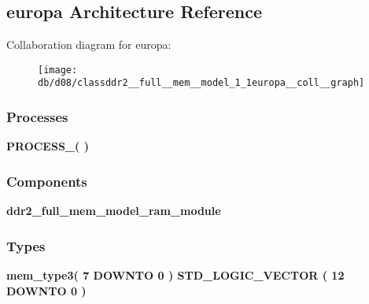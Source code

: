 \subsection{europa Architecture Reference}
\label{classddr2__full__mem__model_1_1europa}


Collaboration diagram for europa\+:\nopagebreak
\begin{figure}[H]
\begin{center}
\leavevmode
\texttt{[image: db/d08/classddr2\_\_full\_\_mem\_\_model\_1\_1europa\_\_coll\_\_graph]}
\end{center}
\end{figure}
\subsubsection*{Processes}
 \begin{DoxyCompactItemize}
\item 
{\bf P\+R\+O\+C\+E\+S\+S\+\_}{\bfseries  (  )}
\end{DoxyCompactItemize}
\subsubsection*{Components}
 \begin{DoxyCompactItemize}
\item 
{\bf ddr2\+\_\+full\+\_\+mem\+\_\+model\+\_\+ram\+\_\+module}  {\bfseries }  
\end{DoxyCompactItemize}
\subsubsection*{Types}
 \begin{DoxyCompactItemize}
\item 
{\bfseries {\bf mem\+\_\+type3}{\bfseries \textcolor{vhdlchar}{(}\textcolor{vhdlchar}{ }\textcolor{vhdlchar}{ } \textcolor{vhdldigit}{7} \textcolor{vhdlchar}{ }\textcolor{keywordflow}{D\+O\+W\+N\+TO}\textcolor{vhdlchar}{ }\textcolor{vhdlchar}{ } \textcolor{vhdldigit}{0} \textcolor{vhdlchar}{ }\textcolor{vhdlchar}{)}\textcolor{vhdlchar}{ }\textcolor{vhdlchar}{ }\textcolor{comment}{S\+T\+D\+\_\+\+L\+O\+G\+I\+C\+\_\+\+V\+E\+C\+T\+OR}\textcolor{vhdlchar}{ }\textcolor{vhdlchar}{(}\textcolor{vhdlchar}{ }\textcolor{vhdlchar}{ } \textcolor{vhdldigit}{12} \textcolor{vhdlchar}{ }\textcolor{keywordflow}{D\+O\+W\+N\+TO}\textcolor{vhdlchar}{ }\textcolor{vhdlchar}{ } \textcolor{vhdldigit}{0} \textcolor{vhdlchar}{ }\textcolor{vhdlchar}{)}\textcolor{vhdlchar}{ }}} 
\end{DoxyCompactItemize}
